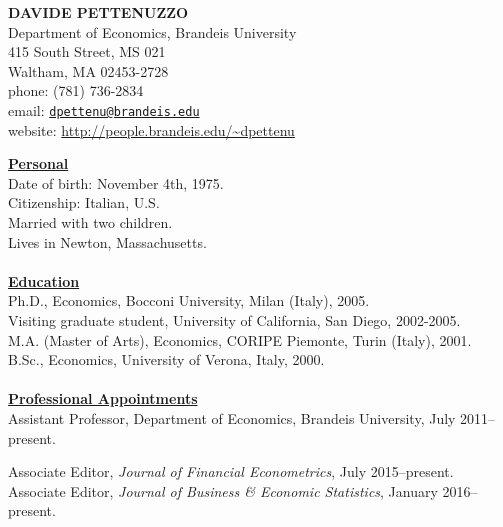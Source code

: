 \documentclass[12pt]{article}
\begin{document}
\begin{center}
\textbf{DAVIDE PETTENUZZO} \\
Department of Economics, Brandeis University \\
415 South Street, MS 021 \\
Waltham, MA 02453-2728 \\
phone: (781) 736-2834 \\
email: \href{mailto:dpettenu@brandeis.edu}{\nolinkurl{dpettenu@brandeis.edu}} \\
website: \url{http://people.brandeis.edu/~dpettenu} \\
\end{center}
\hline 
\bigskip

\underline{\textbf{Personal}}\\
Date of birth: November 4th, 1975. \\
Citizenship: Italian, U.S. \\
Married with two children. \\
Lives in Newton, Massachusetts. \\ \\ 
\underline{\textbf{Education}}\\
Ph.D., Economics, Bocconi University, Milan (Italy), 2005.\\
Visiting graduate student, University of California, San Diego, 2002-2005. \\
M.A. (Master of Arts), Economics, CORIPE Piemonte, Turin (Italy), 2001. \\
B.Sc., Economics, University of Verona, Italy, 2000.\\ \\
\underline{\textbf{Professional Appointments}}\\
Assistant Professor, Department of Economics, Brandeis University, July 2011--present.

Associate Editor, \textit{Journal of Financial Econometrics}, July 2015--present. \\
Associate Editor, \textit{Journal of Business \& Economic Statistics}, January 2016--present.
\end{document}
